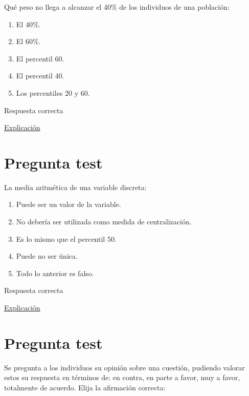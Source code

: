 \documentclass[
]{book}
\providecommand{\tightlist}{%
  \setlength{\itemsep}{0pt}\setlength{\parskip}{0pt}}
\begin{document}
Qué peso no llega a alcanzar el 40\% de los individuos de una población:

\begin{enumerate}
\def\labelenumi{\alph{enumi})}
\tightlist
\item
  El 40\%.
\item
  El 60\%.
\item
  El percentil 60.
\item
  El percentil 40.
\item
  Los percentiles 20 y 60.
\end{enumerate}

Respuesta correcta

\href{https://1fjmanzano.github.io/bioestadistica/medidas-de-posicio\%CC\%81n-dispersio\%CC\%81n-y-forma.html\#medidas-de-posicio\%CC\%81n-no-centrales}{Explicación}

\hypertarget{pregunta-test-72}{%
\section{Pregunta test}\label{pregunta-test-72}}

La media aritmética de una variable discreta:

\begin{enumerate}
\def\labelenumi{\alph{enumi})}
\tightlist
\item
  Puede ser un valor de la variable.
\item
  No debería ser utilizada como medida de centralización.
\item
  Es lo mismo que el percentil 50.
\item
  Puede no ser única.
\item
  Todo lo anterior es falso.
\end{enumerate}

Respuesta correcta

\href{https://1fjmanzano.github.io/bioestadistica/medidas-de-posicio\%CC\%81n-dispersio\%CC\%81n-y-forma.html\#medidas-de-posicio\%CC\%81n-centrales}{Explicación}

\hypertarget{pregunta-test-73}{%
\section{Pregunta test}\label{pregunta-test-73}}

Se pregunta a los individuos su opinión sobre una cuestión, pudiendo valorar estos su respuesta en términos de: en contra, en parte a favor, muy a favor, totalmente de acuerdo. Elija la afirmación correcta:
\end{document}
